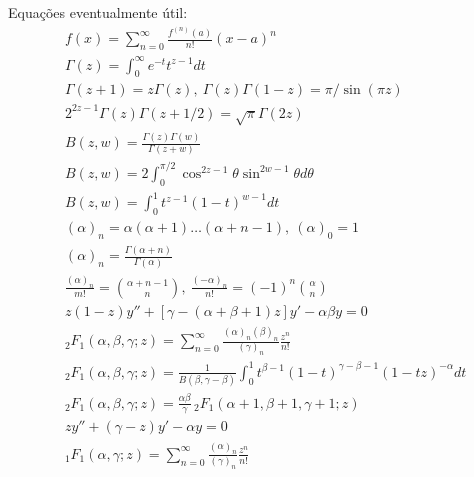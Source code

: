 \documentclass[a4paper,10pt, leqno, answers]{exam}  %
\begin{document}
Equa\c{c}\~{o}es eventualmente útil:
\begin{align}
    & f(x) = \sum_{n = 0}^\infty \frac{f^{(n)}(a)}{n!} (x - a)^n \tag{ST} \label{eq:ser_taylor} \\
    & \Gamma(z) = \int_0^\infty e^{-t} t^{z - 1} dt \tag{GE} \label{eq:gamma_euler} \\
    & \Gamma(z + 1) = z \Gamma(z), \ \Gamma(z) \Gamma(1 - z) = \pi / \sin(\pi z) \label{eq:gamma_rel} \\
    & 2^{2 z - 1} \Gamma(z) \Gamma(z + 1/2) = \sqrt{\pi} \Gamma(2 z) \label{eq:gamma_dup_legendre} \\
    & B(z, w) = \frac{\Gamma(z) \Gamma(w)}{\Gamma(z + w)} \tag{BG} \label{eq:beta} \\
    & B(z, w) = 2 \int_0^{\pi / 2} \cos^{2z - 1} \theta \sin^{2w - 1} \theta d\theta \tag{BT} \label{eq:beta_trig} \\
    & B(z, w) = \int_0^1 t^{z - 1} (1 - t)^{w - 1} dt \tag{BI} \label{eq:beta_int} \\
    & (\alpha)_n = \alpha (\alpha + 1) \ldots (\alpha + n - 1), \ (\alpha)_0 = 1 \tag{SP} \label{eq:sim_poch} \\
    & (\alpha)_n = \frac{\Gamma(\alpha + n)}{\Gamma(\alpha)} \label{eq:sim_poch_gamma} \\
    & \frac{(\alpha)_n}{m!} = \binom{\alpha + n - 1}{n}, \ \frac{(-\alpha)_n}{n!} = (-1)^n \binom{\alpha}{n} \label{eq:sim_poch_binom} \\
    & z(1 - z)y'' + \left[ \gamma - (\alpha + \beta + 1) z \right] y' - \alpha \beta y = 0 \tag{EH} \label{eq:hiperg} \\
    & {}_2F_1(\alpha, \beta, \gamma; z) = \sum_{n = 0}^\infty \frac{(\alpha)_n (\beta)_n}{(\gamma)_n} \frac{z^n}{n!} \tag{SH} \label{eq:ser_hiperg} \\
    & {}_2F_1(\alpha, \beta, \gamma; z) = \frac{1}{B(\beta, \gamma - \beta)} \int_0^1 t^{\beta - 1} (1- t)^{\gamma - \beta - 1} (1 - tz)^{-\alpha} dt \label{eq:hiperg_int} \\
    & {}_2F_1(\alpha, \beta, \gamma; z) = \frac{\alpha \beta}{\gamma} \,{}_2F_1(\alpha + 1, \beta + 1, \gamma + 1; z) \label{eq:hiperg_der} \\
    & zy'' + (\gamma - z)y' - \alpha y = 0 \tag{EHC} \label{eq:hiper_con} \\
    & {}_1F_1(\alpha, \gamma; z) = \sum_{n = 0}^\infty \frac{(\alpha)_n}{(\gamma)_n} \frac{z^n}{n!} \tag{SHC} \label{eq:ser_hiperg_con}
\end{align}
\thispagestyle{headandfoot}
\end{document}
